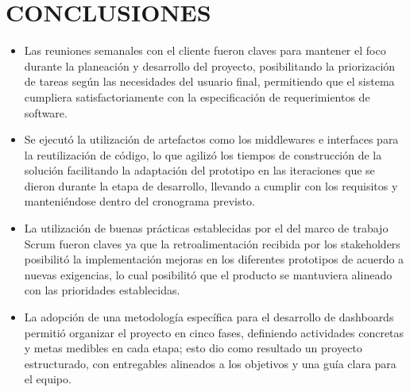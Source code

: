 \documentclass[spanish]{ieee_upb}
\begin{document}
\section{CONCLUSIONES}
\begin{itemize}
  \item Las reuniones semanales con el cliente fueron 
  claves para mantener el foco durante la planeación y 
  desarrollo del proyecto, posibilitando la priorización 
  de tareas según las necesidades del usuario final, 
  permitiendo que el sistema cumpliera satisfactoriamente 
  con la especificación de requerimientos de software. 
  \item Se ejecutó la utilización de artefactos como los 
  middlewares e interfaces para la reutilización de código, 
  lo que agilizó los tiempos de construcción de la solución 
  facilitando la adaptación del prototipo en las iteraciones
   que se dieron durante la etapa de desarrollo, llevando a cumplir 
  con los requisitos y manteniéndose dentro del cronograma previsto.

  \item La utilización de buenas prácticas 
  establecidas por el del marco de trabajo Scrum 
  fueron claves ya que la retroalimentación recibida
   por los stakeholders posibilitó la implementación mejoras
    en los diferentes prototipos de acuerdo a nuevas exigencias, 
    lo cual posibilitó que el producto se 
  mantuviera alineado  con las prioridades establecidas. 

  \item La adopción de una metodología 
  específica para el desarrollo de dashboards
   permitió organizar el proyecto en cinco fases,
    definiendo actividades concretas y metas medibles en
     cada etapa; esto dio como resultado un proyecto 
     estructurado, con entregables 
  alineados a los objetivos y una guía clara para el equipo.


\end{itemize}
\newpage
\end{document}
